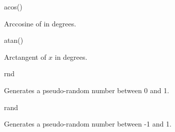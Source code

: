 \begin{math-function}{acos()}

	Arccosine of  in degrees.  

\begin{codeexample}[post=\tt\footnotesize\pgfmathresult]
\end{codeexample}

\end{math-function}

\begin{math-function}{atan()}

	Arctangent of $x$ in degrees. 

\begin{codeexample}[post=\tt\footnotesize\pgfmathresult]
\end{codeexample}

\end{math-function}

\begin{math-function}{rnd}

	Generates a pseudo-random number between 0 and 1.

\begin{codeexample}[post=\tt\footnotesize\pgfmathresult]
\end{codeexample}

\begin{codeexample}[post=\tt\footnotesize\pgfmathresult]
\end{codeexample}

\begin{codeexample}[post=\tt\footnotesize\pgfmathresult]
\end{codeexample}

\end{math-function}

\begin{math-function}{rand}

	Generates a pseudo-random number between -1 and 1.

\begin{codeexample}[post=\tt\footnotesize\pgfmathresult]
\end{codeexample}

\begin{codeexample}[post=\tt\footnotesize\pgfmathresult]
\end{codeexample}

\end{math-function}

\endgroup\medskip\par\leavevmode